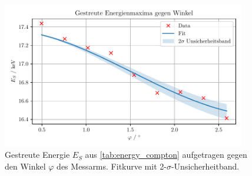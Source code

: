 \documentclass[ngerman]{scrartcl}
\begin{document}
\begin{figure}[H]
    \centering
    \begin{samepage}
        \includegraphics[width=0.95\textwidth]{../plots/energie_winkel.pdf}
        \caption{Gestreute Energie $E_S$ aus \autoref{tab:energy_compton} aufgetragen gegen den Winkel $\varphi$ des Messarms. Fitkurve mit 2-$\sigma$-Unsicherheitband.}
        \label{fig:compton_energy}
    \end{samepage}
\end{figure}
\newpage
\end{document}
